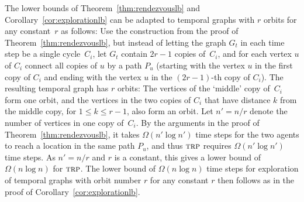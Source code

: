 \documentclass[10pt,a4paper]{article}
\newcommand{\trp}{\textsc{trp}}
\begin{document}
{The lower bounds of Theorem~\ref{thm:rendezvouslb} and
Corollary~\ref{cor:explorationlb} can be adapted to temporal graphs with $r$
orbits for any constant~$r$ as follows: Use the construction from the proof of
Theorem~\ref{thm:rendezvouslb}, but instead of letting the graph $G_t$ in each
time step be a single cycle~$C_i$, let $G_t$ contain $2r-1$ copies of~$C_i$, and
for each vertex $u$ of $C_i$ connect all copies of $u$ by a path $P_u$ (starting
with the vertex $u$ in the first copy of $C_i$ and ending with the vertex $u$ in
the $(2r-1)$-th copy of $C_i$). The resulting temporal graph has $r$ orbits: The
vertices of the `middle' copy of~$C_i$ form one orbit, and the vertices in the
two copies of $C_i$ that have distance $k$ from the middle copy, for $1\le k\le
r-1$, also form an orbit. Let $n'=n/r$ denote the number of vertices in one copy
of~$C_i$. By the arguments in the proof of Theorem~\ref{thm:rendezvouslb}, it
takes $\Omega(n'\log n')$ time steps for the two agents to reach a location in
the same path $P_u$, and thus $\trp$ requires $\Omega(n'\log n')$ time steps. As
$n'=n/r$ and $r$ is a constant, this gives a lower bound of $\Omega(n\log n)$
for $\trp$. The lower bound of $\Omega(n \log n)$ time steps for exploration of
temporal graphs with orbit number $r$ for any constant $r$ then follows as in
the proof of Corollary~\ref{cor:explorationlb}.}
\end{document}
